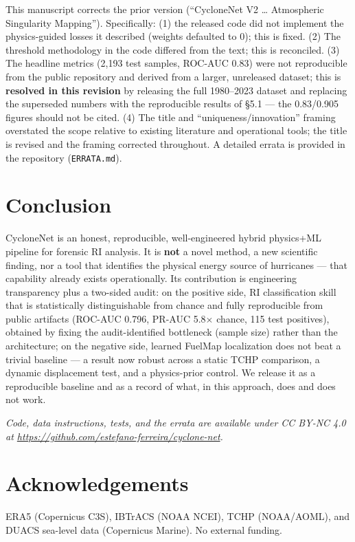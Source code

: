 \documentclass[11pt]{article}
\begin{document}
This manuscript corrects the prior version (``CycloneNet V2 \ldots{}
Atmospheric Singularity Mapping''). Specifically: (1) the released code did
not implement the physics-guided losses it described (weights defaulted to
0); this is fixed. (2) The threshold methodology in the code differed from
the text; this is reconciled. (3) The headline metrics (2{,}193 test samples,
ROC-AUC 0.83) were not reproducible from the public repository and derived
from a larger, unreleased dataset; this is \textbf{resolved in this revision}
by releasing the full 1980--2023 dataset and replacing the superseded numbers
with the reproducible results of \S5.1 --- the 0.83/0.905 figures should not
be cited. (4) The title and ``uniqueness/innovation'' framing overstated the
scope relative to existing literature and operational tools; the title is
revised and the framing corrected throughout. A detailed errata is provided
in the repository (\texttt{ERRATA.md}).

\section{Conclusion}

CycloneNet is an honest, reproducible, well-engineered hybrid physics+ML
pipeline for forensic RI analysis. It is \textbf{not} a novel method, a new
scientific finding, nor a tool that identifies the physical energy source of
hurricanes --- that capability already exists operationally. Its contribution
is engineering transparency plus a two-sided audit: on the positive side, RI
classification skill that is statistically distinguishable from chance and
fully reproducible from public artifacts (ROC-AUC 0.796, PR-AUC 5.8$\times$
chance, 115 test positives), obtained by fixing the audit-identified
bottleneck (sample size) rather than the architecture; on the negative side,
learned FuelMap localization does not beat a trivial baseline --- a result
now robust across a static TCHP comparison, a dynamic displacement test, and
a physics-prior control. We release it as a reproducible baseline and as a
record of what, in this approach, does and does not work.

\vspace{1em}
\noindent\emph{Code, data instructions, tests, and the errata are available
under CC BY-NC 4.0 at
\url{https://github.com/estefano-ferreira/cyclone-net}.}

\section*{Acknowledgements}

ERA5 (Copernicus C3S), IBTrACS (NOAA NCEI), TCHP (NOAA/AOML), and DUACS
sea-level data (Copernicus Marine). No external funding.
\end{document}
